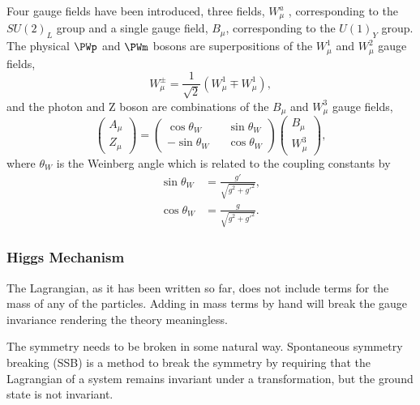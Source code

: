 Four gauge fields have been introduced, 
three fields, ${W}^{a}_{\mu}$ , corresponding to the $SU(2)_{L}$
group and a single gauge field, $B_{\mu}$, corresponding to the $U(1)_{Y}$ group.
The physical $\PWp$ and $\PWm$ bosons are superpositions of the $W^{1}_{\mu}$
and $W^{2}_{\mu}$ gauge fields,
\begin{equation}
W^{\pm}_{\mu} = \frac{1}{\sqrt{2}} \left(W^{1}_{\mu} \mp W^{1}_{\mu}\right),
\label{eq:wgauge}
\end{equation}
and the photon and Z boson are combinations of the $B_{\mu}$ and $W^{3}_{\mu}$
gauge fields,
\begin{equation}
\left( \begin{matrix} A_{\mu}\\ Z_{\mu}\end{matrix}\right) =
\left( \begin{matrix} \cos\theta_{W} && \sin\theta_{W} \\  
                      -\sin\theta_{W} && \cos\theta_{W} \end{matrix}\right) 
\left( \begin{matrix} B_{\mu}\\ W^{3}_{\mu}\end{matrix}\right) ,
\label{eq:bgauge}
\end{equation}
where $\theta_{W}$ is the Weinberg angle which is related to the coupling
constants by
\begin{align*}
\sin\theta_{W} &= \frac{g\prime}{\sqrt{g^{2}+g\prime^{2}}},\\
\cos\theta_{W} &= \frac{g}{\sqrt{g^{2}+g\prime^{2}}}.
\end{align*}

\subsubsection{Higgs Mechanism}

The Lagrangian, as it has been written so far, does not include terms for the
mass of any of the particles.  Adding in mass terms by hand will break the gauge
invariance rendering the theory meaningless.  

The symmetry needs to be broken in some natural way.  Spontaneous symmetry
breaking (SSB) is a method to break the symmetry by requiring that the Lagrangian of a
system remains invariant under a transformation, but the ground state is not
invariant.

